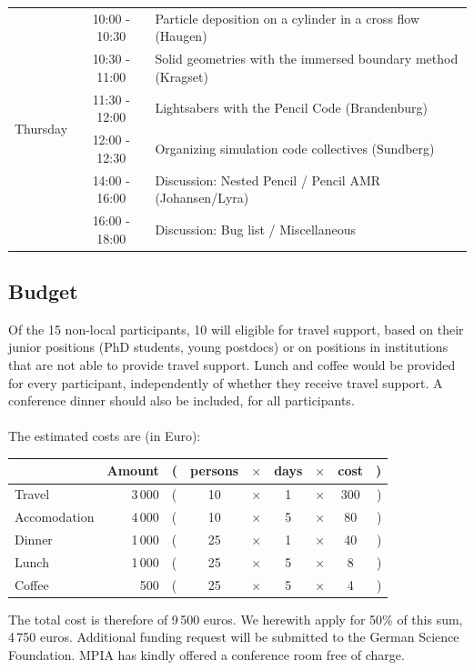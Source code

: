 \documentclass{article}
\begin{document}
\begin{table}
\begin{center}
\begin{tabular}{|l||cl|}
%
\multirow{6}{*}{Thursday} &10:00 - 10:30&Particle deposition on a cylinder in a cross flow (Haugen)\\
                          &10:30 - 11:00&Solid geometries with the immersed boundary method (Kragset)\\
                          &11:30 - 12:00&Lightsabers with the {\sc Pencil Code} (Brandenburg)\\
                          &12:00 - 12:30&Organizing simulation code collectives (Sundberg)\\
                          &14:00 - 16:00&Discussion: Nested Pencil / Pencil AMR (Johansen/Lyra)\\
                          &16:00 - 18:00&Discussion: Bug list / Miscellaneous\\\hline
\end{tabular}
\end{center}
\end{table}

\subsection*{Budget}
Of the 15 non-local participants, 10 will eligible for travel 
support, based on their junior positions (PhD students, young
postdocs) or on positions in institutions that are not able to provide
travel support. Lunch and coffee would be provided for every participant, 
independently of whether they receive travel support. A conference dinner 
should also be included, for all participants.
\\ \\
The estimated costs are (in Euro):
\begin{center}
  \begin{tabular}{|l | r l c c c c c r|}\hline
                & Amount &(& persons &$\times$& days &$\times$& cost &)\\\hline
  Travel        & 3\,000 &(& 10      &$\times$&  1   &$\times$& 300  &)\\
  Accomodation  & 4\,000 &(& 10      &$\times$&  5   &$\times$&  80  &)\\
  Dinner        & 1\,000 &(& 25      &$\times$&  1   &$\times$&  40  &)\\
  Lunch         & 1\,000 &(& 25      &$\times$&  5   &$\times$&   8  &)\\
  Coffee        &    500 &(& 25      &$\times$&  5   &$\times$&   4  &)\\\hline
  \end{tabular}
\end{center}The total cost is therefore of 9\,500 euros. We herewith 
apply for 50\% of this sum, 4\,750 euros. Additional funding request 
will be submitted to the German Science Foundation. MPIA has 
kindly offered a conference room free of charge. 
\end{document}
